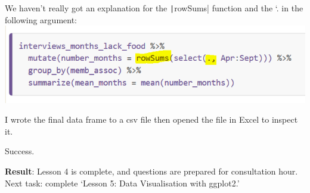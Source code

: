 \documentclass{article}
\begin{document}
{\item We haven’t really got an explanation for the \texttt|rowSums| function and the `. in the following argument:
\includegraphics[width=1.0\textwidth]{rstudio_25.PNG}
\item I wrote the final data frame to a csv file then opened the file in Excel to inspect it. \item Success.}
\textbf{Result}: Lesson 4 is complete, and questions are prepared for consultation hour. Next task: complete ‘Lesson 5: Data Visualisation with ggplot2.’
\end{document}

